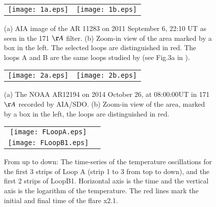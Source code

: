 \documentclass[oneside,onecolumn]{article}
\begin{document}
\begin{figure}[htp]
  \centering
 \begin{tabular}{cc}
    \texttt{[image: 1a.eps]}&
    \hspace{1cm}
    \texttt{[image: 1b.eps]}\\
 \end{tabular}
\caption{(a) AIA image of the AR 11283 on 2011 September 6, 22:10 UT as seen in the 171 $\AA$  filter. (b) Zoom-in view of the area marked by a box in the left. The selected loops are distinguished in red. The loops A and B are the same loops studied by \citet{ref:Jain2015} (see Fig.3a in \citet{ref:Jain2015}).}
\label{Fig1}
\end{figure}

\begin{figure}[htp]
  \centering
    \begin{tabular}{cc}
    \texttt{[image: 2a.eps]}&
    \hspace{1.5cm}
    \texttt{[image: 2b.eps]}\\
  \end{tabular}
\caption{(a) The NOAA AR12194 on 2014 October 26, at 08:00:00UT in 171 $\AA$ recorded by AIA/SDO. (b) Zoom-in view of the area, marked by a box in the left, the loops are distinguished in red.}
\label{fig2}
\end{figure}

\begin{figure}[htp]
  \centering
    \begin{tabular}{cc}
    \texttt{[image: FLoopA.eps]}\\
    \texttt{[image: FLoopB1.eps]}\\  
   \end{tabular}
\caption{From up to down: The time-series of the temperature oscillations for the first 3 strips of Loop A (strip 1 to 3 from top to down), and the first 2 strips of LoopB1. 
 Horizontal axis is the time and the vertical axis is the logarithm of the temperature. The red lines mark the initial and final time of the flare x2.1.}
 \label{fig3}
\end{figure}
\end{document}
